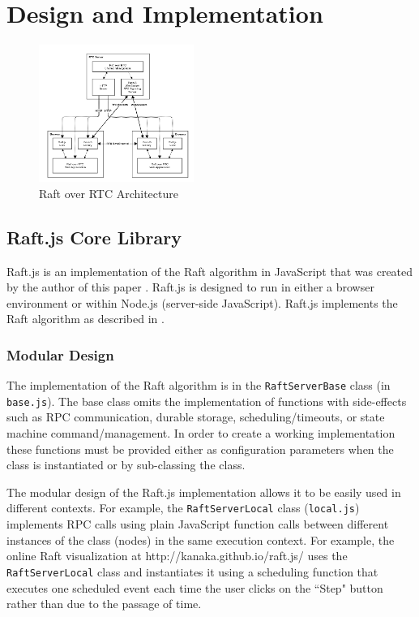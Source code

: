 \documentclass[conference,compsoc]{./IEEEtran/IEEEtran}
\begin{document}
\section{Design and Implementation}

\begin{figure}[!t]
  \centerline{\includegraphics[width=0.45\textwidth]{imgs/raft_rtc_architecture}}
  \caption{Raft over RTC Architecture}
    \label{fig:raft_rtc_architecture}
\end{figure}

\subsection{Raft.js Core Library}

Raft.js is an implementation of the Raft algorithm in JavaScript that
was created by the author of this paper \cite{raft.js}.  Raft.js is
designed to run in either a browser environment or within Node.js
(server-side JavaScript). Raft.js implements the Raft algorithm as
described in \cite[Consensus:~Diego]{raft_thesis:ongaro14}.

\subsubsection{Modular Design}

The implementation of the Raft algorithm is in the
\texttt{RaftServerBase} class (in \texttt{base.js}). The base class
omits the implementation of functions with side-effects such as RPC
communication, durable storage, scheduling/timeouts, or state machine
command/management. In order to create a working implementation these
functions must be provided either as configuration parameters when the
class is instantiated or by sub-classing the class.

The modular design of the Raft.js implementation allows it to be
easily used in different contexts. For example, the \texttt{RaftServerLocal}
class (\texttt{local.js}) implements RPC calls using plain JavaScript function
calls between different instances of the class (nodes) in the same
execution context. For example, the online Raft visualization at
http://kanaka.github.io/raft.js/
\cite{raft.js:visualization} uses the \texttt{RaftServerLocal} class
and instantiates it using a scheduling function that executes one
scheduled event each time the user clicks on the ``Step" button rather
than due to the passage of time.
\end{document}
